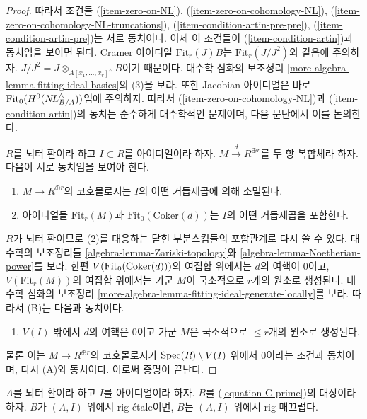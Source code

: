 \begin{proof}
\medskip\noindent
따라서 조건들
(\ref{item-zero-on-NL}),
(\ref{item-zero-on-cohomology-NL}),
(\ref{item-zero-on-cohomology-NL-truncations}),
(\ref{item-condition-artin-pre-pre}),
(\ref{item-condition-artin-pre})는 서로 동치이다.
이제 이 조건들이 (\ref{item-condition-artin})과 동치임을 보이면 된다.
Cramer 아이디얼 $\text{Fit}_r(J) B$는 $\text{Fit}_r(J/J^2)$와 같음에 주의하자.
$J/J^2 = J \otimes_{A[x_1, \ldots, x_r]^\wedge} B$이기 때문이다.
대수학 심화의 보조정리 \ref{more-algebra-lemma-fitting-ideal-basics}의 (3)을 보라.
또한 Jacobian 아이디얼은 바로 $\text{Fit}_0(H^0(\mathop{N\!L}\nolimits_{B/A}^\wedge))$임에 주의하자.
따라서 (\ref{item-zero-on-cohomology-NL})과 (\ref{item-condition-artin})의 동치는
순수하게 대수학적인 문제이며, 다음 문단에서 이를 논의한다.

\medskip\noindent
$R$를 뇌터 환이라 하고 $I \subset R$를 아이디얼이라 하자.
$M \xrightarrow{d} R^{\oplus r}$를 두 항 복합체라 하자.
다음이 서로 동치임을 보여야 한다.
\begin{enumerate}
\item[(A)] $M \to R^{\oplus r}$의 코호몰로지는 $I$의 어떤 거듭제곱에 의해 소멸된다.
\item[(B)] 아이디얼들 $\text{Fit}_r(M)$과 $\text{Fit}_0(\text{Coker}(d))$는
$I$의 어떤 거듭제곱을 포함한다.
\end{enumerate}
$R$가 뇌터 환이므로 (2)를 대응하는 닫힌 부분스킴들의 포함관계로 다시 쓸 수 있다.
대수학의 보조정리들 \ref{algebra-lemma-Zariski-topology}와
\ref{algebra-lemma-Noetherian-power}를 보라.
한편 $V(\text{Fit}_0(\mathop{\mathrm{Coker}}(d)))$의 여집합 위에서는 $d$의 여핵이 0이고,
$V(\text{Fit}_r(M))$의 여집합 위에서는 가군 $M$이 국소적으로 $r$개의 원소로 생성된다.
대수학 심화의 보조정리 \ref{more-algebra-lemma-fitting-ideal-generate-locally}를 보라.
따라서 (B)는 다음과 동치이다.
\begin{enumerate}
\item[(C)] $V(I)$ 밖에서 $d$의 여핵은 0이고 가군 $M$은 국소적으로
$\leq r$개의 원소로 생성된다.
\end{enumerate}
물론 이는 $M \to R^{\oplus r}$의 코호몰로지가
$\mathop{\mathrm{Spec}}(R) \setminus V(I)$ 위에서 0이라는 조건과 동치이며, 다시 (A)와 동치이다.
이로써 증명이 끝난다.
\end{proof}

\begin{lemma}
\label{lemma-rig-etale-rig-smooth}
$A$를 뇌터 환이라 하고 $I$를 아이디얼이라 하자.
$B$를 (\ref{equation-C-prime})의 대상이라 하자.
$B$가 $(A, I)$ 위에서 rig-\'etale이면, $B$는 $(A, I)$ 위에서 rig-매끄럽다.
\end{lemma}


